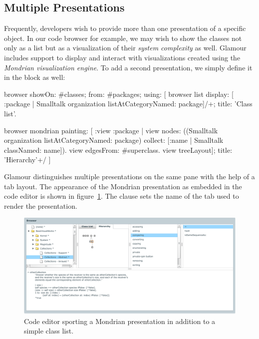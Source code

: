 \documentclass[a4paper,10pt,twoside]{book}
\begin{document}
\subsection{Multiple Presentations}

Frequently, developers wish to provide more than one presentation of a
specific object. In our code browser for example, we may wish to show
the classes not only as a list but as a visualization of their
\emph{system complexity} as well. Glamour includes support to display
and interact with visualizations created using the \emph{Mondrian
  visualization engine}. To add a second presentation, we simply
define it in the  block as well:

\begin{code}{}
browser showOn: #classes; from: #packages; using: [
	browser list
        display: [ :package | Smalltalk organization listAtCategoryNamed: package]/+;
        title: 'Class list'.

	browser mondrian
             painting: [ :view :package |
		view nodes: ((Smalltalk organization listAtCategoryNamed: package)
                                    collect: [:name | Smalltalk classNamed: name]).
		view edgesFrom: #superclass.
		view treeLayout];
             title: 'Hierarchy'+/
]
\end{code}

Glamour distinguishes multiple presentations on the same pane with the
help of a tab layout. The appearance of the Mondrian presentation as
embedded in the code editor is shown in
figure~\ref{fig:mondrian-presentation}. The clause  sets
the name of the tab used to render the presentation.

\begin{figure}[htbp]
\centerline{\includegraphics[width=\linewidth]{mondrian-presentation.pdf}}
\caption{Code editor sporting a Mondrian presentation in addition to a simple class list.}
\label{fig:mondrian-presentation}
\end{figure}
\end{document}
